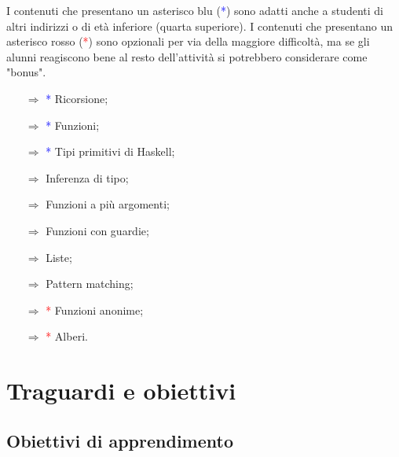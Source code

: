 I contenuti che presentano un asterisco blu (\textcolor{blue}{*}) sono
adatti anche a studenti di altri indirizzi o di età inferiore (quarta superiore). I contenuti che presentano un asterisco rosso (\textcolor{red}{*}) sono
opzionali per via della maggiore difficoltà, ma se gli alunni reagiscono bene al resto dell'attività
si potrebbero considerare come "bonus".

\begin{itemize}
    \item [$\Rightarrow$] \textcolor{blue}{*} Ricorsione;
    \item [$\Rightarrow$] \textcolor{blue}{*} Funzioni;
    \item [$\Rightarrow$] \textcolor{blue}{*} Tipi primitivi di Haskell;
    \item [$\Rightarrow$] Inferenza di tipo;
    \item [$\Rightarrow$] Funzioni a più argomenti;
    \item [$\Rightarrow$] Funzioni con guardie;
    \item [$\Rightarrow$] Liste;
    \item [$\Rightarrow$] Pattern matching;
    \item [$\Rightarrow$] \textcolor{red}{*} Funzioni anonime;
    \item [$\Rightarrow$] \textcolor{red}{*} Alberi.
\end{itemize}

\section{Traguardi e obiettivi}

\subsection{Obiettivi di apprendimento}



